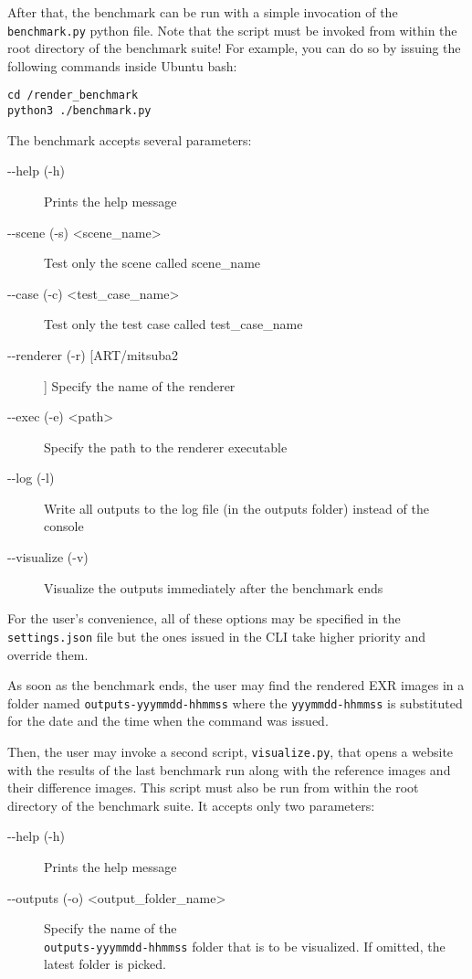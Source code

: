 \documentclass[12pt,a4paper]{report}
\begin{document}
After that, the benchmark can be run with a simple invocation of the \\ \texttt{benchmark.py} python file. Note that the script must be invoked from within the root directory of the benchmark suite! For example, you can do so by issuing the following commands inside Ubuntu bash:

\begin{lstlisting}
cd /render_benchmark
python3 ./benchmark.py
\end{lstlisting}

The benchmark accepts several parameters:
\begin{description}
	\item[-{}-help (-h)] Prints the help message
	\item[-{}-scene (-s) \textless scene\_name\textgreater] Test only the scene called scene\_name
	\item[-{}-case (-c) \textless test\_case\_name\textgreater] Test only the test case called test\_case\_name
	\item[-{}-renderer (-r) [ART/mitsuba2]] Specify the name of the renderer 
	\item[-{}-exec (-e) \textless path\textgreater] Specify the path to the renderer executable
	\item[-{}-log (-l)] Write all outputs to the log file (in the outputs folder) instead of the console
	\item[-{}-visualize (-v)] Visualize the outputs immediately after the benchmark ends
\end{description}

For the user's convenience, all of these options may be specified in the \\ \texttt{settings.json} file but the ones issued in the CLI take higher priority and override them.

As soon as the benchmark ends, the user may find the rendered EXR images in a folder named \texttt{outputs-yyymmdd-hhmmss} where the \texttt{yyymmdd-hhmmss} is substituted for the date and the time when the command was issued.

Then, the user may invoke a second script, \texttt{visualize.py}, that opens a website with the results of the last benchmark run along with the reference images and their difference images. This script must also be run from within the root directory of the benchmark suite. It accepts only two parameters:

\begin{description}
	\item[-{}-help (-h)] Prints the help message
	\item[-{}-outputs (-o) \textless output\_folder\_name\textgreater] Specify the name of the\\ \texttt{outputs-yyymmdd-hhmmss} folder that is to be visualized. If omitted, the latest folder is picked.
\end{description}
\end{document}

